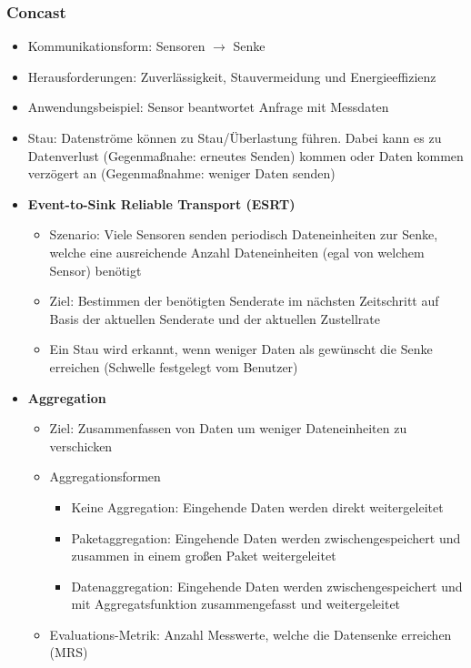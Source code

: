 \subsubsection{Concast}
\begin{itemize}
	\item Kommunikationsform: Sensoren \(\rightarrow\) Senke
	\item Herausforderungen: Zuverlässigkeit, Stauvermeidung und Energieeffizienz
	\item Anwendungsbeispiel: Sensor beantwortet Anfrage mit Messdaten
	\item Stau: Datenströme können zu Stau/Überlastung führen. Dabei kann es zu Datenverlust (Gegenmaßnahe: erneutes Senden) kommen oder Daten kommen verzögert an (Gegenmaßnahme: weniger Daten senden)
	\item \textbf{Event-to-Sink Reliable Transport (ESRT)}
	\begin{itemize}
		\item Szenario: Viele Sensoren senden periodisch Dateneinheiten zur Senke, welche eine ausreichende Anzahl Dateneinheiten (egal von welchem Sensor) benötigt
		\item Ziel: Bestimmen der benötigten Senderate im nächsten Zeitschritt auf Basis der aktuellen Senderate und der aktuellen Zustellrate
		\item Ein Stau wird erkannt, wenn weniger Daten als gewünscht die Senke erreichen (Schwelle festgelegt vom Benutzer)
	\end{itemize}
	\item \textbf{Aggregation}
	\begin{itemize}
		\item Ziel: Zusammenfassen von Daten um weniger Dateneinheiten zu verschicken
		\item Aggregationsformen
		\begin{itemize}
			\item Keine Aggregation: Eingehende Daten werden direkt weitergeleitet
			\item Paketaggregation: Eingehende Daten werden zwischengespeichert und zusammen in einem großen Paket weitergeleitet
			\item Datenaggregation: Eingehende Daten werden zwischengespeichert und mit Aggregatsfunktion zusammengefasst und weitergeleitet
		\end{itemize}
		\item Evaluations-Metrik: Anzahl Messwerte, welche die Datensenke erreichen (MRS)
		\begin{itemize}

\end{itemize}
\end{itemize}
\end{itemize}
